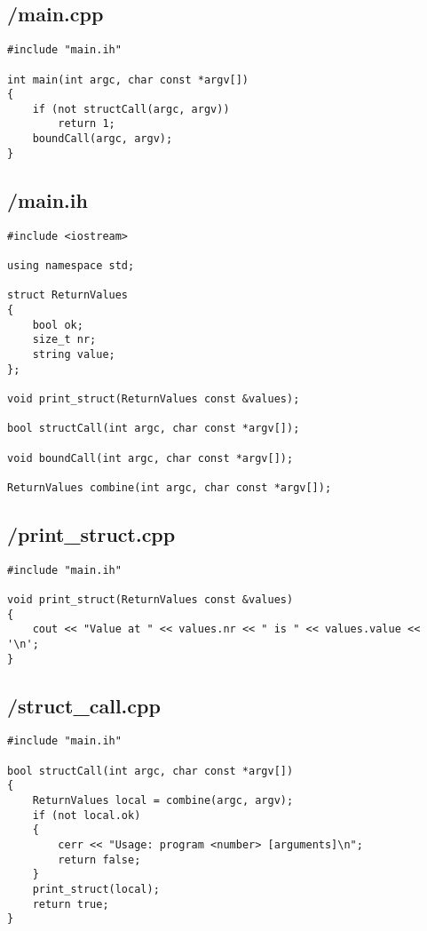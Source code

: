 \documentclass{article}
\begin{document}
\subsection*{/main.cpp}
\begin{verbatim}
#include "main.ih"

int main(int argc, char const *argv[])
{
    if (not structCall(argc, argv))
        return 1;
    boundCall(argc, argv);
}

\end{verbatim}
\subsection*{/main.ih}
\begin{verbatim}
#include <iostream>

using namespace std;

struct ReturnValues
{
    bool ok;
    size_t nr;
    string value;
};

void print_struct(ReturnValues const &values);

bool structCall(int argc, char const *argv[]);

void boundCall(int argc, char const *argv[]);

ReturnValues combine(int argc, char const *argv[]);

\end{verbatim}
\subsection*{/print\_struct.cpp}
\begin{verbatim}
#include "main.ih"

void print_struct(ReturnValues const &values)
{
    cout << "Value at " << values.nr << " is " << values.value << '\n';
}
\end{verbatim}
\subsection*{/struct\_call.cpp}
\begin{verbatim}
#include "main.ih"

bool structCall(int argc, char const *argv[])
{
    ReturnValues local = combine(argc, argv);
    if (not local.ok)
    {
        cerr << "Usage: program <number> [arguments]\n";
        return false;
    }
    print_struct(local);
    return true;
}

\end{verbatim}
\end{document}
